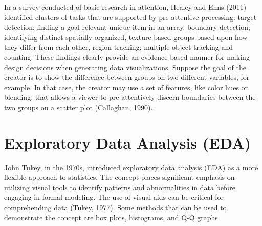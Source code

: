 \documentclass[print]{nuthesis}
\begin{document}
In a survey conducted of basic research in attention, Healey and Enns (2011) identified clusters of tasks that are supported by pre-attentive processing: target detection; finding a goal-relevant unique item in an array, boundary detection; identifying distinct spatially organized, texture-based groups based upon how they differ from each other, region tracking; multiple object tracking and counting.
These findings clearly provide an evidence-based manner for making design decisions when generating data visualizations.
Suppose the goal of the creator is to show the difference between groups on two different variables, for example.
In that case, the creator may use a set of features, like color hues or blending, that allows a viewer to pre-attentively discern boundaries between the two groups on a scatter plot (Callaghan, 1990).

\hypertarget{exploratory-data-analysis-eda}{%
\section{Exploratory Data Analysis (EDA)}\label{exploratory-data-analysis-eda}}

John Tukey, in the 1970s, introduced exploratory data analysis (EDA) as a more flexible approach to statistics.
The concept places significant emphasis on utilizing visual tools to identify patterns and abnormalities in data before engaging in formal modeling.
The use of visual aids can be critical for comprehending data (Tukey, 1977).
Some methods that can be used to demonstrate the concept are box plots, histograms, and Q-Q graphs.
\end{document}
